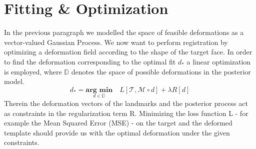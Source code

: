 \section{Fitting \& Optimization}
\label{sec:optimization}
In the previous paragraph we modelled the space of feasible deformations as a vector-valued Gaussian Process. We now want to perform registration by optimizing a deformation field according to the shape of the target face. 
In order to find the deformation corresponding to the optimal fit $d_{*}$ a linear optimization is employed, where $\mathbb{D}$ denotes the space of possible deformations in the posterior model.
\begin{equation}
    d_{*} = \underset{d \in \mathbb{D}}{\textbf{arg min}}\quad L[\mathcal{T}, \mathcal{M }\circ d]+\lambda R[d]
\end{equation}
Therein the deformation vectors of the landmarks and the posterior process act as constraints in the regularization term R. Minimizing the loss function L - for example the Mean Squared Error (MSE) - on the target and the deformed template should provide us with the optimal deformation under the given constraints.\\ 

